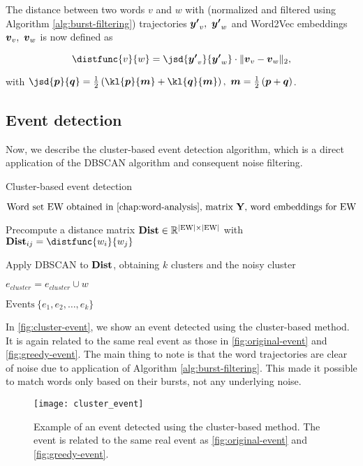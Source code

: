 The distance between two words $v$ and $w$ with (normalized and filtered using Algorithm \ref{alg:burst-filtering}) trajectories $\vect{\trajn}_{v},\ \vect{\trajn}_{w}$ and Word2Vec embeddings $\embed_{v},\ \embed_{w}$ is now defined as

\begin{equation}
	\distfunc{v}{w} = \jsd{\vect{\trajn}_{v}}{\vect{\trajn}_{w}} \cdot \| \embed_{v} - \embed_{w}\|_{2},
\end{equation}

with $\jsd{\vect{p}}{\vect{q}} = \frac{1}{2} \left( \kl{\vect{p}}{\vect{m}} + \kl{\vect{q}}{\vect{m}} \right) ,\ \vect{m} = \frac{1}{2} \left( \vect{p} + \vect{q} \right)$.


\subsection{Event detection}
Now, we describe the cluster-based event detection algorithm, which is a direct application of the DBSCAN algorithm and consequent noise filtering.

\begin{algorithm}[H]
\begin{algorithmic}[1]
\caption{Cluster-based event detection}
\Input $\text{Word set EW obtained in \autoref{chap:word-analysis}, matrix } \trajmat \text{, word embeddings for EW}$

\State Precompute a distance matrix $\mathbf{Dist} \in \mathbb{R}^{\left\vert \text{EW} \right\vert \times \left\vert \text{EW} \right\vert}$ with $\distmat_{ij} = \distfunc{w_{i}}{w_{j}}$

\State Apply DBSCAN to $\mathbf{Dist}$, obtaining $k$ clusters and the noisy cluster

		\State $e_{cluster} = e_{cluster} \cup w$
	\EndIf
\EndFor

\Output $\text{Events} ~ \{ e_{1}, e_{2}, \dots, e_{k} \}$
\end{algorithmic}
\end{algorithm}

In \autoref{fig:cluster-event}, we show an event detected using the cluster-based method. It is again related to the same real event as those in \autoref{fig:original-event} and \autoref{fig:greedy-event}. The main thing to note is that the word trajectories are clear of noise due to application of Algorithm \ref{alg:burst-filtering}. This made it possible to match words only based on their bursts, not any underlying noise.

\begin{figure}
  \centering
  \texttt{[image: cluster\_event]}  %
  \caption{Example of an event detected using the cluster-based method. The event is related to the same real event as \autoref{fig:original-event} and \autoref{fig:greedy-event}.}
  \label{fig:cluster-event}
\end{figure}

